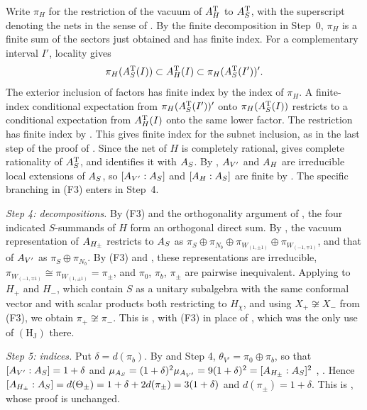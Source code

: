 \documentclass[leqno]{article}
\let\cal\relax
\newcommand{\cal}{\mathcal}
\numberwithin{equation}{section}
\begin{document}
Write $\pi_H$ for the restriction of the vacuum of $\cal A_H^{\mathrm T}$ to $\cal A_S^{\mathrm T}$, with the superscript denoting the nets in the sense of \cite{Ten19}. By the finite decomposition in Step~0, $\pi_H$ is a finite sum of the sectors just obtained and has finite index. For a complementary interval $I'$, locality gives
\[
\pi_H(\cal A_S^{\mathrm T}(I))
 \subset \cal A_H^{\mathrm T}(I)
 \subset \pi_H(\cal A_S^{\mathrm T}(I'))'.
\]
The exterior inclusion of factors has finite index by the index of $\pi_H$. A finite-index conditional expectation from $\pi_H(\cal A_S^{\mathrm T}(I'))'$ onto $\pi_H(\cal A_S^{\mathrm T}(I))$ restricts to a conditional expectation from $\cal A_H^{\mathrm T}(I)$ onto the same lower factor. The restriction has finite index by \cite[Remark 3.13(i) p.~227]{BDH88}. This gives finite index for the subnet inclusion, as in the last step of the proof of \cite[Corollary 4.24]{Ten24}. Since the net of $H$ is completely rational, \cite[Theorem 24 p.~20]{Lon03} gives complete rationality of $\cal A_S^{\mathrm T}$, and \cite[Lemma 7.6 p.~72]{Ten19} identifies it with $\cal A_S$. By \cite[Theorem 4.5]{ArhII}, $\cal A_{V'}$ and $\cal A_H$ are irreducible local extensions of $\cal A_S$, so $[\cal A_{V'}:\cal A_S]$ and $[\cal A_H:\cal A_S]$ are finite by \cite[Proposition 2.5(2)]{ArhII}. The specific branching in (F3) enters in Step~4.

\emph{Step 4: decompositions.} By (F3) and the orthogonality argument of \cite[proof of Theorem 5.6(2)]{ArhII}, the four indicated $S$-summands of $H$ form an orthogonal direct sum. By \cite[Lemma 4.7(1)]{ArhII}, the vacuum representation of $\cal A_{H_\pm}$ restricts to $\cal A_S$ as $\pi_S \oplus \pi_{N_b} \oplus \pi_{W_{(1,\pm1)}} \oplus \pi_{W_{(-1,\mp1)}}$, and that of $\cal A_{V'}$ as $\pi_S \oplus \pi_{N_b}$. By (F3) and \cite[Lemma 4.7(2),(3)]{ArhII}, these representations are irreducible, $\pi_{W_{(-1,\mp1)}} \cong \pi_{W_{(1,\pm1)}} = \pi_\pm$, and $\pi_0$, $\pi_b$, $\pi_\pm$ are pairwise inequivalent. Applying \cite[Lemma 4.7(3)]{ArhII} to $H_+$ and $H_-$, which contain $S$ as a unitary subalgebra with the same conformal vector and with scalar products both restricting to $H_\chi$, and using $X_+ \not\cong X_-$ from (F3), we obtain $\pi_+ \not\cong \pi_-$. This is \cite[Theorem 5.6(2)]{ArhII}, with (F3) in place of \cite[Lemma 5.4]{ArhII}, which was the only use of $\mathrm{(H_J)}$ there.

\emph{Step 5: indices.} Put $\delta = d(\pi_b)$. By \cite[Proposition 2.5(1),(3)]{ArhII} and Step 4, $\theta_{V'} = \pi_0 \oplus \pi_b$, so that $[\cal A_{V'} : \cal A_S] = 1+\delta$ and $\mu_{\cal A_S} = (1+\delta)^2\mu_{\cal A_{V'}} = 9(1+\delta)^2 = [\cal A_{H_\pm} : \cal A_S]^2$ \cite[Proposition 4.3(2)]{ArhII}, \cite[Proposition 24]{KLM01}. Hence $[\cal A_{H_\pm} : \cal A_S] = d(\Theta_\pm) = 1+\delta+2d(\pi_\pm) = 3(1+\delta)$ and $d(\pi_\pm) = 1+\delta$. This is \cite[Theorem 5.6(3)]{ArhII}, whose proof is unchanged.
\end{document}
